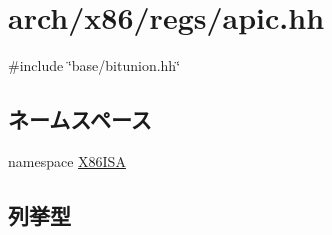 \hypertarget{apic_8hh}{
\section{arch/x86/regs/apic.hh}
\label{apic_8hh}
}
{\ttfamily \#include \char`\"{}base/bitunion.hh\char`\"{}}\par
\subsection*{ネームスペース}
\begin{DoxyCompactItemize}
\item 
namespace \hyperlink{namespaceX86ISA}{X86ISA}
\end{DoxyCompactItemize}
\subsection*{列挙型}
